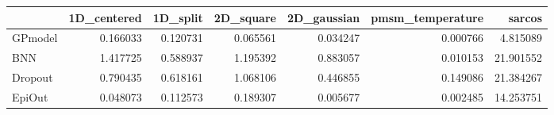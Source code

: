 \begin{tabular}{lrrrrrr}
\toprule
{} &  1D\_centered &  1D\_split &  2D\_square &  2D\_gaussian &  pmsm\_temperature &     sarcos \\
\midrule
GPmodel &     0.166033 &  0.120731 &   0.065561 &     0.034247 &          0.000766 &   4.815089 \\
BNN     &     1.417725 &  0.588937 &   1.195392 &     0.883057 &          0.010153 &  21.901552 \\
Dropout &     0.790435 &  0.618161 &   1.068106 &     0.446855 &          0.149086 &  21.384267 \\
EpiOut  &     0.048073 &  0.112573 &   0.189307 &     0.005677 &          0.002485 &  14.253751 \\
\bottomrule
\end{tabular}
